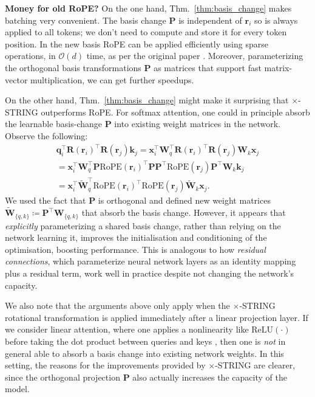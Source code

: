 \textbf{Money for old RoPE?}
On the one hand, Thm.~\ref{thm:basis_change} makes batching very convenient.
The basis change $\mathbf{P}$ is independent of $\boldsymbol{r}_i$ so is always applied to all tokens; we don't need to compute and store it for every token position.
In the new basis RoPE can be applied efficiently using sparse operations, in $\mathcal{O}(d)$ time, as per the original paper \citep{heo2025rotary}.
Moreover, parameterizing the orthogonal basis transformations $\mathbf{P}$ as matrices that support fast matrix-vector multiplication, we can get further speedups.

On the other hand, Thm.~\ref{thm:basis_change} might make it surprising that $\times$-STRING outperforms RoPE.
For softmax attention, one could in principle absorb the learnable basis-change $\mathbf{P}$ into existing weight matrices in the network.
Observe the following:
\begin{equation}
\begin{multlined}
    \mathbf{q}_i^\top \mathbf{R}(\mathbf{r}_i)^\top \mathbf{R}(\mathbf{r}_j)\mathbf{k}_j = \mathbf{x}_i^\top \mathbf{W}_q^\top \mathbf{R}(\mathbf{r}_i)^\top \mathbf{R}(\mathbf{r}_j) \mathbf{W}_k \mathbf{x}_j \\  = \mathbf{x}_i^\top \mathbf{W}_q^\top \mathbf{P} \textrm{RoPE}(\mathbf{r}_i)^\top \mathbf{P} \mathbf{P}^\top \textrm{RoPE}(\mathbf{r}_j) \mathbf{P}^\top \mathbf{W}_k \mathbf{k}_j
    \\ = \mathbf{x}_i^\top \widetilde{\mathbf{W}}_q^\top \textrm{RoPE}(\mathbf{r}_i)^\top \textrm{RoPE}(\mathbf{r}_j) \widetilde{\mathbf{W}}_k \mathbf{x}_j.
\end{multlined}
\end{equation} 
We used the fact that $\mathbf{P}$ is orthogonal and defined new weight matrices $\widetilde{\mathbf{W}}_{\{q,k\}} \coloneqq \mathbf{P}^\top \mathbf{W}_{\{q,k\}}$ that absorb the basis change.
However, it appears that \emph{explicitly} parameterizing a shared basis change, rather than relying on the network learning it, improves the initialisation and conditioning of the optimisation, boosting performance.
This is analogous to how \emph{residual connections}, which parameterize neural network layers as an identity mapping plus a residual term, work well in practice despite not changing the network's capacity.

We also note that the arguments above only apply when the $\times$-STRING rotational transformation is applied immediately after a linear projection layer. 
If we consider linear attention, where one applies a nonlinearity like $\textrm{ReLU}(\cdot)$ before taking the dot product between queries and keys \citep{katharopoulos2020transformers}, then one is \emph{not} in general able to absorb a basis change into existing network weights. 
In this setting, the reasons for the improvements provided by $\times$-STRING are clearer, since the orthogonal projection $\mathbf{P}$ also actually increases the capacity of the model.


